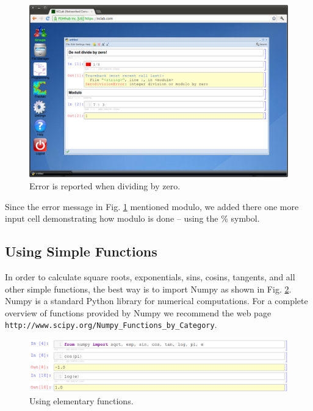 \documentclass[article,A4,12pt]{llncs}
\begin{document}
\newpage
\begin{figure}[!ht]
\begin{center}
\includegraphics[width=\textwidth]{img/divzero.png}
\end{center}
\caption{Error is reported when dividing by zero.}
\label{fig:divzero}
\end{figure}
\noindent
Since the error message in Fig. \ref{fig:divzero} mentioned modulo, we added there one more 
input cell demonstrating how modulo is done -- using the \% symbol.

\subsection{Using Simple Functions}

In order to calculate square roots, exponentials, sins, cosins, tangents, and all other 
simple functions, the best way is to import Numpy as shown in Fig. \ref{fig:fns}. Numpy is a standard Python library for
numerical computations.
For a complete overview of functions provided by Numpy we recommend the 
web page {\tt http://www.scipy.org/Numpy\_Functions\_by\_Category}.

\newpage
\begin{figure}[!ht]
\begin{center}
\includegraphics[width=\textwidth]{img/fns.png}
\end{center}
\vspace{-4mm}
\caption{Using elementary functions.}
\label{fig:fns}
\end{figure}
\noindent
\end{document}
